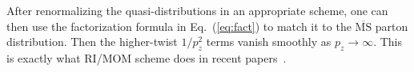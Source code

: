 After renormalizing the quasi-distributions in an appropriate scheme, one can then use the factorization formula in Eq.~(\ref{eq:fact}) to match it to the $\overline{\text{MS}}$ parton distribution. Then the higher-twist $1/p_z^2$ terms vanish smoothly as $p_z\rightarrow \infty$.
This is exactly what RI/MOM scheme does in recent papers~\cite{Alexandrou:2017huk,Chen:2017mzz,Stewart:2017tvs}.
